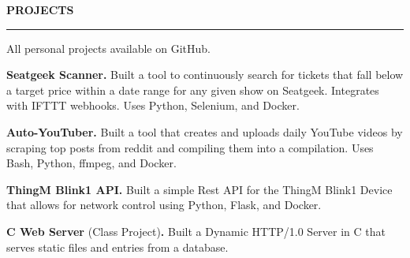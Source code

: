 \documentclass[10pt,letterpaper]{article}
\begin{document}

\medskip
\MakeUppercase{{\bf Projects}} %
\medskip
\hrule %
\begin{list}{}{\setlength{\leftmargin}{0em}}
\item %
\vspace{-1.25em}
\item {All personal projects available on GitHub. }
\item \textbf{Seatgeek Scanner.} {Built a tool to continuously search for tickets that fall below a target price within a date range for any given show on Seatgeek. Integrates with IFTTT webhooks. Uses Python, Selenium, and Docker. }
\item \textbf{Auto-YouTuber.} {Built a tool that creates and uploads daily YouTube videos by scraping top posts from reddit and compiling them into a compilation. Uses Bash, Python, ffmpeg, and Docker. }
\item \textbf{ThingM Blink1 API.} {Built a simple Rest API for the ThingM Blink1 Device that allows for network control using Python, Flask, and Docker.}
\item \textbf{C Web Server} {(Class Project)\textbf{.} Built a Dynamic HTTP/1.0 Server in C that serves static files and entries from a database.}
\end{list}

\end{document}
